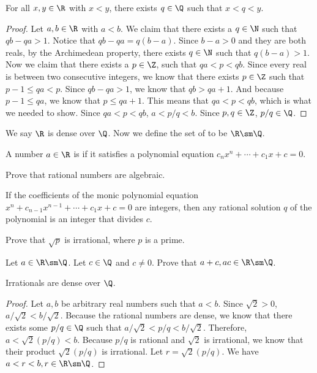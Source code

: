 \documentclass[10pt]{article}
\begin{document}
\begin{proposition}
    For all $x,y\in\R$ with $x<y$, there exists $q\in\Q$ such that $x<q<y$.
\end{proposition}
\begin{proof}
    Let $a,b\in\R$ with $a<b$. We claim that there exists a $q\in\N$ such that $qb-qa>1$. Notice that $qb-qa=q(b-a)$. Since $b-a>0$ and they are both reals, by the Archimedean property, there exists $q\in\N$ such that $q(b-a)>1$. Now we claim that there exists a $p\in\Z$, such that $qa<p<qb$. Since every real is between two consecutive integers, we know that there exists $p\in\Z$ such that $p-1\le qa<p$. Since $qb-qa>1$, we know that $qb>qa+1$. And because $p-1\leq qa$, we know that $p\leq qa+1$. This means that $qa<p<qb$, which is what we needed to show. Since $qa<p<qb$, $a<{p}/{q}<b$. Since $p,q\in\Z$, $p/q\in\Q$.
\end{proof}
\par
We say $\R$ is dense over $\Q$. Now we define the set of  to be $\R\sm\Q$.
\begin{definition}
    A number $a\in\R$ is  if it satisfies a polynomial equation ${c}_{n}{x}^{n}+\cdots+{c}_{1}x+c=0$.
\end{definition}
\begin{problem}
    Prove that rational numbers are algebraic.
\end{problem}
\begin{proposition}
    If the coefficients of the monic polynomial equation ${x}^{n}+{c}_{n-1}{x}^{n-1}+\cdots+{c}_{1}x+c=0$ are integers, then any rational solution $q$ of the polynomial is an integer that divides $c$.
\end{proposition}
\begin{problem}
    Prove that $\sqrt{p}$ is irrational, where $p$ is a prime.
\end{problem}
\begin{problem}
    Let $a\in\R\sm\Q$. Let $c\in\Q$ and $c\ne 0$. Prove that $a+c,ac\in\R\sm\Q$.
\end{problem}
\begin{proposition}
    Irrationals are dense over $\Q$.
\end{proposition}
\begin{proof}
    Let $a,b$ be arbitrary real numbers such that $a<b$. Since $\sqrt{2}>0$, ${a}/{\sqrt{2}}<{b}/{\sqrt{2}}$. Because the rational numbers are dense, we know that there exists some ${p}/{q}\in\Q$ such that ${a}/{\sqrt{2}}<{p}/{q}<{b}/{\sqrt{2}}$. Therefore, $a<\sqrt{2}({p}/{q})<b$. Because ${p}/{q}$ is rational and $\sqrt{2}$ is irrational, we know that their product $\sqrt{2}({p}/{q})$ is irrational. Let $r=\sqrt{2}({p}/{q})$. We have $a<r<b,r\in\R\sm\Q$.
\end{proof}
\end{document}
